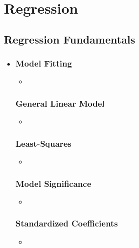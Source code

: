 \chapter{Regression}

\section{Regression Fundamentals}
\begin{itemize}
  \item[]
  
  \subsection{Model Fitting}
  \begin{itemize}
    \item 
  \end{itemize}

  \subsection{General Linear Model}
  \begin{itemize}
    \item 
  \end{itemize}

  \subsection{Least-Squares}
  \begin{itemize}
    \item 
  \end{itemize}

  \subsection{Model Significance}
  \begin{itemize}
    \item 
  \end{itemize}

  \subsection{Standardized Coefficients}
  \begin{itemize}
    \item 
  \end{itemize}
  
\end{itemize}

